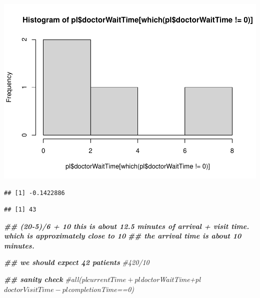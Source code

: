 \documentclass[
]{book}
\newenvironment{Shaded}{\begin{snugshade}}{\end{snugshade}}
\newcommand{\CommentTok}[1]{\textcolor[rgb]{0.56,0.35,0.01}{\textit{#1}}}
\newcommand{\DecValTok}[1]{\textcolor[rgb]{0.00,0.00,0.81}{#1}}
\newcommand{\DocumentationTok}[1]{\textcolor[rgb]{0.56,0.35,0.01}{\textbf{\textit{#1}}}}
\newcommand{\FunctionTok}[1]{\textcolor[rgb]{0.00,0.00,0.00}{#1}}
\newcommand{\NormalTok}[1]{#1}
\newcommand{\SpecialCharTok}[1]{\textcolor[rgb]{0.00,0.00,0.00}{#1}}
\theoremstyle{definition}
\theoremstyle{definition}
\theoremstyle{definition}
\theoremstyle{definition}
\theoremstyle{remark}
\begin{document}
\includegraphics{_main_files/figure-latex/unnamed-chunk-9-3.pdf}

\begin{Shaded}
\end{Shaded}

\begin{verbatim}
## [1] -0.1422886
\end{verbatim}

\begin{Shaded}
\end{Shaded}

\begin{verbatim}
## [1] 43
\end{verbatim}

\begin{Shaded}
\begin{Highlighting}[]
\DocumentationTok{\#\# (20{-}5)/6 + 10 this is about 12.5 minutes of arrival + visit time. which is approximately close to 10 }
\DocumentationTok{\#\# the arrival time is about 10 minutes.  }

\DocumentationTok{\#\# we should expect 42 patients}
 \CommentTok{\#420/10}
  
  \DocumentationTok{\#\# sanity check}
  \CommentTok{\#all(pl$currentTime+pl$doctorWaitTime+pl$doctorVisitTime{-}pl$completionTime==0)}
\end{Highlighting}
\end{Shaded}
\end{document}
